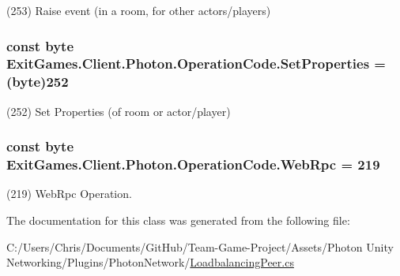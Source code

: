 (253) Raise event (in a room, for other actors/players)

\subsubsection[{\texorpdfstring{Set\+Properties}{SetProperties}}]{\setlength{\rightskip}{0pt plus 5cm}const byte Exit\+Games.\+Client.\+Photon.\+Operation\+Code.\+Set\+Properties = (byte)252}\hypertarget{class_exit_games_1_1_client_1_1_photon_1_1_operation_code_a1e9bdcbf6be26d2157af2df0daaef988}{}\label{class_exit_games_1_1_client_1_1_photon_1_1_operation_code_a1e9bdcbf6be26d2157af2df0daaef988}


(252) Set Properties (of room or actor/player)

\subsubsection[{\texorpdfstring{Web\+Rpc}{WebRpc}}]{\setlength{\rightskip}{0pt plus 5cm}const byte Exit\+Games.\+Client.\+Photon.\+Operation\+Code.\+Web\+Rpc = 219}\hypertarget{class_exit_games_1_1_client_1_1_photon_1_1_operation_code_af3a967de533671c1a5b04c698c19c84b}{}\label{class_exit_games_1_1_client_1_1_photon_1_1_operation_code_af3a967de533671c1a5b04c698c19c84b}


(219) Web\+Rpc Operation.



The documentation for this class was generated from the following file\+:\begin{DoxyCompactItemize}
\item 
C\+:/\+Users/\+Chris/\+Documents/\+Git\+Hub/\+Team-\/\+Game-\/\+Project/\+Assets/\+Photon Unity Networking/\+Plugins/\+Photon\+Network/\hyperlink{_loadbalancing_peer_8cs}{Loadbalancing\+Peer.\+cs}\end{DoxyCompactItemize}
